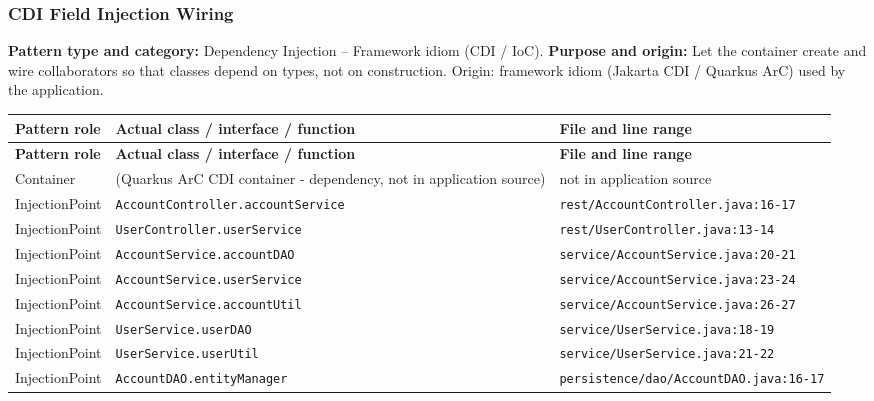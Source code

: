 \documentclass[11pt,a4paper]{article}
\begin{document}
\subsubsection{CDI Field Injection Wiring}
\textbf{Pattern type and category:} Dependency Injection -- Framework idiom (CDI / IoC). \textbf{Purpose and origin:} Let the container create and wire collaborators so that classes depend on types, not on construction. Origin: framework idiom (Jakarta CDI / Quarkus ArC) used by the application.
{\footnotesize
\begin{longtable}{@{}p{3.1cm}p{5.6cm}p{7cm}@{}}
\toprule \textbf{Pattern role} & \textbf{Actual class / interface / function} & \textbf{File and line range} \\ \midrule \endfirsthead
\toprule \textbf{Pattern role} & \textbf{Actual class / interface / function} & \textbf{File and line range} \\ \midrule \endhead
\bottomrule \endfoot
Container & (Quarkus ArC CDI container - dependency, not in application source) & not in application source \\
InjectionPoint & \texttt{AccountController.\allowbreak{}accountService} & \texttt{rest/\allowbreak{}AccountController.\allowbreak{}java:\allowbreak{}16-17} \\
InjectionPoint & \texttt{UserController.\allowbreak{}userService} & \texttt{rest/\allowbreak{}UserController.\allowbreak{}java:\allowbreak{}13-14} \\
InjectionPoint & \texttt{AccountService.\allowbreak{}accountDAO} & \texttt{service/\allowbreak{}AccountService.\allowbreak{}java:\allowbreak{}20-21} \\
InjectionPoint & \texttt{AccountService.\allowbreak{}userService} & \texttt{service/\allowbreak{}AccountService.\allowbreak{}java:\allowbreak{}23-24} \\
InjectionPoint & \texttt{AccountService.\allowbreak{}accountUtil} & \texttt{service/\allowbreak{}AccountService.\allowbreak{}java:\allowbreak{}26-27} \\
InjectionPoint & \texttt{UserService.\allowbreak{}userDAO} & \texttt{service/\allowbreak{}UserService.\allowbreak{}java:\allowbreak{}18-19} \\
InjectionPoint & \texttt{UserService.\allowbreak{}userUtil} & \texttt{service/\allowbreak{}UserService.\allowbreak{}java:\allowbreak{}21-22} \\
InjectionPoint & \texttt{AccountDAO.\allowbreak{}entityManager} & \texttt{persistence/\allowbreak{}dao/\allowbreak{}AccountDAO.\allowbreak{}java:\allowbreak{}16-17} \\

\end{longtable}}
\end{document}
